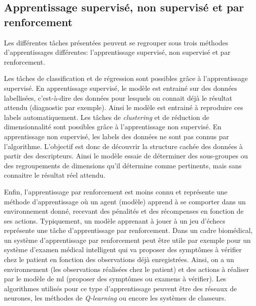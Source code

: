 \subsection{Apprentissage supervisé, non supervisé et par renforcement}
Les différentes tâches présentées peuvent se regrouper sous trois méthodes d'apprentissages différentes: l'apprentissage supervisé, non supervisé et par renforcement.

Les tâches de classification et de régression sont possibles grâce à l'apprentissage supervisé. En apprentissage supervisé, le modèle est entrainé sur des données labellisées, c'est-à-dire des données pour lesquels on connait déjà le résultat attendu (diagnostic par exemple). Ainsi le modèle est entrainé à reproduire ces labels automatiquement.
Les tâches de \textit{clustering} et de réduction de dimensionnalité sont possibles grâce à l'apprentissage non supervisé. En apprentissage non supervisé, les labels des données ne sont pas connus par l'algorithme. L'objectif est donc de découvrir la structure cachée des données à partir des descripteurs. Ainsi le modèle essaie de déterminer des sous-groupes ou des regroupements de dimensions qu'il détermine comme pertinents, mais sans connaitre le résultat réel attendu.

Enfin, l'apprentissage par renforcement est moins connu et représente une méthode d'apprentissage où un agent (modèle) apprend à se comporter dans un environnement donné, recevant des pénalités et des récompenses en fonction de ses actions. Typiquement,  un modèle apprenant à jouer à un jeu d'échecs représente une tâche d'apprentissage par renforcement. Dans un cadre biomédical, un système d'apprentissage par renforcement peut être utile par exemple pour un système d'examen médical intelligent qui va proposer des symptômes à vérifier chez le patient en fonction des observations déjà enregistrées. Ainsi, on a un environnement (les observations réalisées chez le patient) et des actions à réaliser par le modèle de \gls{ml} (proposer des symptômes ou examens à vérifier). Les algorithmes utilisés pour ce type d'apprentissage peuvent être des réseaux de neurones, les méthodes de \textit{Q-learning} ou encore les systèmes de classeurs.

